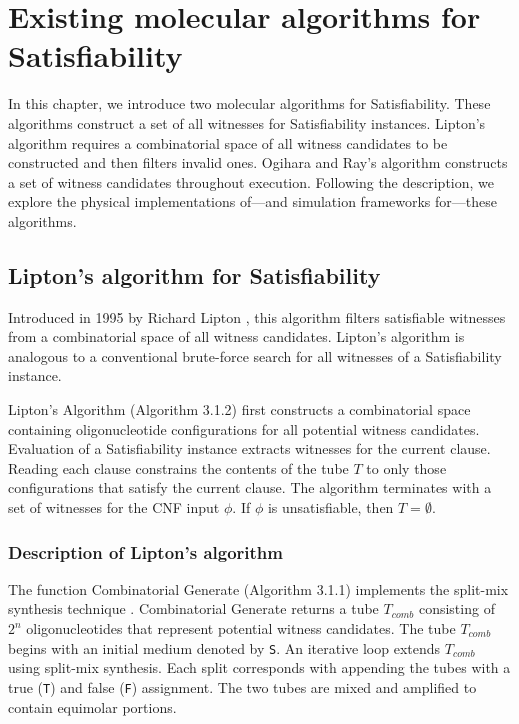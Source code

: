 \chapter{Existing molecular algorithms for {\sc Satisfiability}}


In this chapter, we introduce two molecular algorithms for {\sc Satisfiability}.  These algorithms construct a set of all witnesses for {\sc Satisfiability} instances.  Lipton's algorithm requires a combinatorial space of all witness candidates to be constructed and then filters invalid ones.  Ogihara and Ray's algorithm constructs a set of witness candidates throughout execution.  Following the description, we explore the physical implementations of---and simulation frameworks for---these algorithms.
\section{Lipton's algorithm for {\sc Satisfiability}}


Introduced in 1995 by Richard Lipton \cite{Lipton95usingdna}, this algorithm filters satisfiable witnesses from a combinatorial space of all witness candidates.  Lipton's algorithm is analogous to a conventional brute-force search for all witnesses of a {\sc Satisfiability} instance.

{\sc Lipton's Algorithm} (Algorithm 3.1.2) first constructs a combinatorial space containing oligonucleotide configurations for all potential witness candidates.  Evaluation of a {\sc Satisfiability} instance extracts witnesses for the current clause.  Reading each clause constrains the contents of the tube $T$ to only those configurations that satisfy the current clause.  The algorithm terminates with a set of witnesses for the CNF input $\phi$.  If $\phi$ is unsatisfiable, then $T = \emptyset$.  

	\subsection{Description of Lipton's algorithm}
		
The function {\sc Combinatorial Generate} (Algorithm 3.1.1) implements the split-mix synthesis technique \cite{furka1982, furkaBook}.  {\sc Combinatorial Generate} returns a tube $T_{comb}$ consisting of $2^n$ oligonucleotides that represent potential witness candidates.  The tube $T_{comb}$ begins with an initial medium denoted by \texttt{S}.  An iterative loop extends $T_{comb}$ using split-mix synthesis.  Each split corresponds with appending the tubes with a true (\texttt{T}) and false (\texttt{F}) assignment.  The two tubes are mixed and amplified to contain equimolar portions.  


